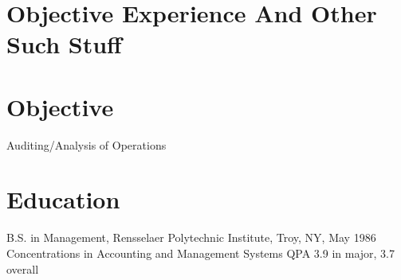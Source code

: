 \documentclass{nfriend-resume}
\begin{document}
 

\MakeHeader
        
\section{Objective Experience And Other Such Stuff}
\noindent
\blindtext

\section{Objective}
\noindent
Auditing/Analysis of Operations

\section{Education}
\noindent
B.S. in Management, Rensselaer Polytechnic Institute, Troy, NY, May 1986
Concentrations in Accounting and Management Systems
QPA 3.9 in major, 3.7 overall                        
\end{document}
